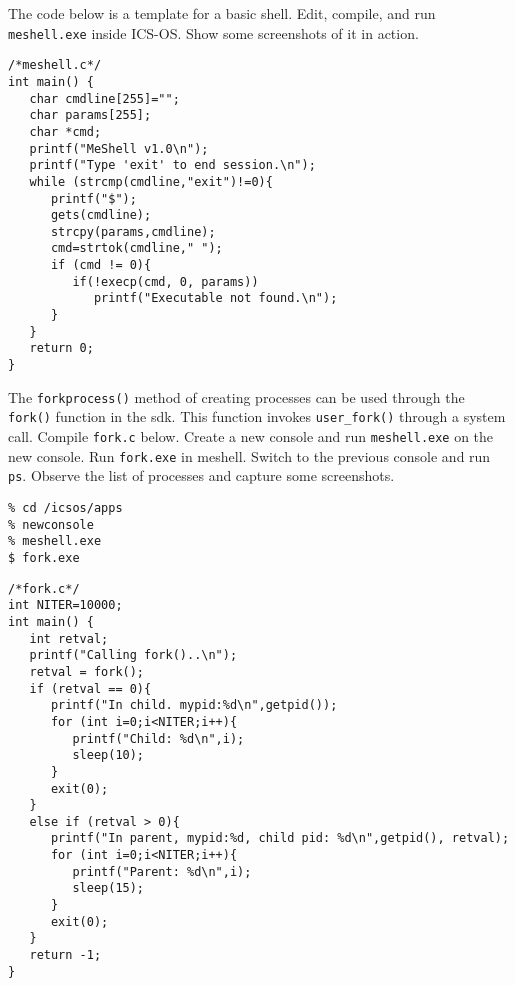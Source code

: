 \documentclass[a4paper, 11pt,oneside]{article}
\begin{document}
The code below is a template for a basic shell. Edit, compile, and run \texttt{meshell.exe} inside ICS-OS. Show some screenshots of it in action.  

\begin{verbatim}
/*meshell.c*/
int main() {
   char cmdline[255]="";
   char params[255];
   char *cmd;
   printf("MeShell v1.0\n");
   printf("Type 'exit' to end session.\n");
   while (strcmp(cmdline,"exit")!=0){
      printf("$");
      gets(cmdline);
      strcpy(params,cmdline);
      cmd=strtok(cmdline," ");
      if (cmd != 0){ 
         if(!execp(cmd, 0, params))
            printf("Executable not found.\n");
      }   
   }   
   return 0;
}

\end{verbatim}

\noindent{}

The \texttt{forkprocess()} method of creating processes can be used through the \texttt{fork()} function in the sdk. This function invokes  
\texttt{user\_fork()} through a system call. Compile \texttt{fork.c} below. Create a new console and run \texttt{meshell.exe} on the new console. Run \texttt{fork.exe} in meshell. Switch to the previous console and run \texttt{ps}. Observe the list of processes and capture some screenshots.
\begin{verbatim}
% cd /icsos/apps
% newconsole
% meshell.exe
$ fork.exe
\end{verbatim}

\begin{verbatim}
/*fork.c*/
int NITER=10000;
int main() {
   int retval;
   printf("Calling fork()..\n");
   retval = fork();
   if (retval == 0){
      printf("In child. mypid:%d\n",getpid());
      for (int i=0;i<NITER;i++){
         printf("Child: %d\n",i);
         sleep(10);
      }
      exit(0);
   }
   else if (retval > 0){
      printf("In parent, mypid:%d, child pid: %d\n",getpid(), retval);
      for (int i=0;i<NITER;i++){
         printf("Parent: %d\n",i);
         sleep(15);
      }
      exit(0);
   }
   return -1;
}
\end{verbatim}
\end{document}
